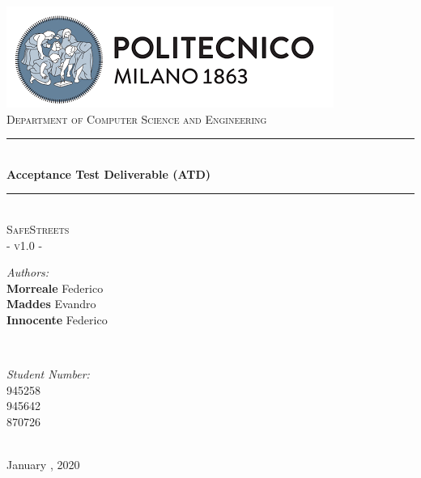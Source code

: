 \documentclass[a4paper, hidelinks, 12pt]{report}
\begin{document}
    \begin{titlepage}
        \centering
        \vspace*{0.7 cm}
        \includegraphics[scale = 0.85]{assets/polimi.png}\\[1.6 cm]
        \textsc{\large Department of Computer Science and Engineering}\\[1.8 cm]

        \rule{\linewidth}{0.2 mm} \\[0.4 cm]
        { \huge \bfseries Acceptance Test Deliverable (ATD)}\\
        \rule{\linewidth}{0.2 mm} \\[1.5 cm]

        \textsc{\Large SafeStreets}\\[0.5 cm]
        \textsc{\large - v1.0 -}\\[1 cm]

        \begin{minipage}{0.4\textwidth}
            \begin{flushleft}
                \large
                \emph{Authors:}\\
                \textbf{Morreale} Federico \\
                \textbf{Maddes} Evandro \\
                \textbf{Innocente} Federico
            \end{flushleft}
        \end{minipage}~
        \begin{minipage}{0.4\textwidth}
            \begin{flushright}
                \large
                \emph{Student Number:} \\
                945258 \\
                945642 \\
                870726
            \end{flushright}
        \end{minipage}\\[2 cm]


        {\large January  , 2020}\\[2 cm]

        \vfill
    \end{titlepage}

    \tableofcontents
    \newpage
    \listoftables
    \clearpage
    \setcounter{page}{1}

    \newpage
    
\end{document}
